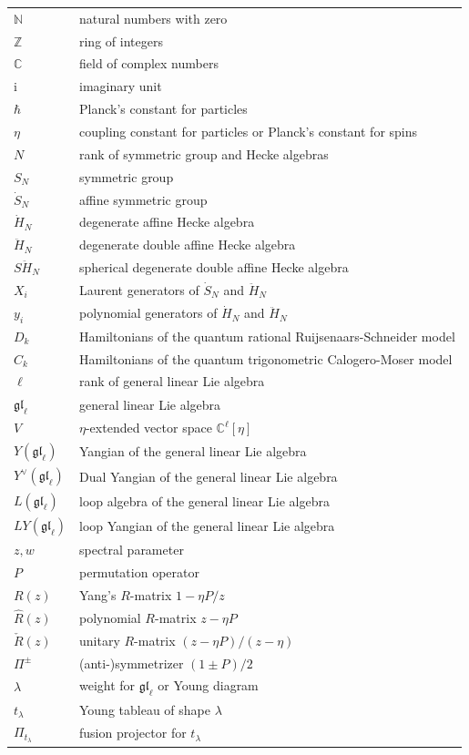 \documentclass[11pt]{report}
\theoremstyle{definition}
\theoremstyle{remark}
\theoremstyle{remark}
\newcommand{\N}{\mathbb{N}}
\newcommand{\Z}{\mathbb{Z}}
\newcommand{\C}{\mathbb{C}}
\newcommand{\I}{\mathrm{i}}
\begin{document}
\begin{tabular}{l|l}
$\N$ & natural numbers with zero \\
$\Z$ & ring of integers \\
$\C$ & field of complex numbers \\
$\I$ & imaginary unit \\
$\hbar$ & Planck's constant for particles \\
$\eta$ & coupling constant for particles or Planck's constant for spins \\
$N$ & rank of symmetric group and Hecke algebras \\
$S_N$ & symmetric group \\
$\dot S_N$ & affine symmetric group \\
$\dot H_N$ & degenerate affine Hecke algebra \\
$\ddot H_N$ & degenerate double affine Hecke algebra \\
$S\ddot H_N$ & spherical degenerate double affine Hecke algebra \\
$X_i$ & Laurent generators of $\dot S_N$ and $\ddot H_N$ \\
$y_i$ & polynomial generators of $\dot H_N$ and $\ddot H_N$ \\
$D_k$ & Hamiltonians of the quantum rational Ruijsenaars-Schneider model \\
$C_k$ & Hamiltonians of the quantum trigonometric Calogero-Moser model \\
$\ell$ & rank of general linear Lie algebra \\
$\mathfrak{gl}_\ell$ & general linear Lie algebra \\
$V$ & $\eta$-extended vector space $\C^\ell[\eta]$ \\
$Y(\mathfrak{gl}_\ell)$ & Yangian of the general linear Lie algebra \\
$Y^\vee(\mathfrak{gl}_\ell)$ & Dual Yangian of the general linear Lie algebra \\
$L(\mathfrak{gl}_\ell)$ & loop algebra of the general linear Lie algebra \\
$LY(\mathfrak{gl}_\ell)$ & loop Yangian of the general linear Lie algebra \\
$z,w$ & spectral parameter \\
$P$ & permutation operator \\
$R(z)$ & Yang's $R$-matrix $1-\eta P/z$ \\
$\hat R(z)$ & polynomial $R$-matrix $z-\eta P$ \\
$\check R(z)$ & unitary $R$-matrix $(z-\eta P)/(z-\eta)$ \\
$\Pi^\pm$ & (anti-)symmetrizer $(1 \pm P)/2$ \\
$\lambda$ & weight for $\mathfrak{gl}_\ell$ or Young diagram \\
$t_\lambda$ & Young tableau of shape $\lambda$ \\
$\Pi_{t_\lambda}$ & fusion projector for $t_\lambda$
\end{tabular}
\end{document}
